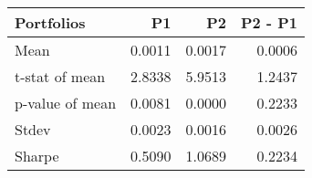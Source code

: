 \begin{tabular}{lrrr}
\toprule
Portfolios & P1 & P2 & P2 - P1 \\
\midrule
Mean & 0.0011 & 0.0017 & 0.0006 \\
t-stat of mean & 2.8338 & 5.9513 & 1.2437 \\
p-value of mean & 0.0081 & 0.0000 & 0.2233 \\
Stdev & 0.0023 & 0.0016 & 0.0026 \\
Sharpe & 0.5090 & 1.0689 & 0.2234 \\
\bottomrule
\end{tabular}

